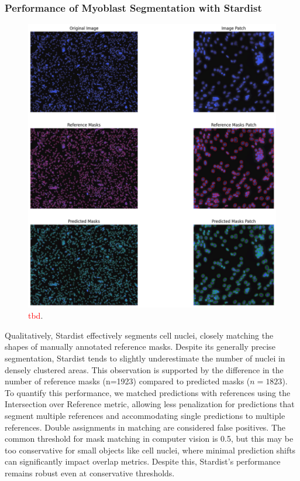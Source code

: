 \subsubsection{Performance of Myoblast Segmentation with Stardist}

\begin{figure}
	\centering
	\includegraphics[width=\textwidth]{"images/qualitative_performance_stardist.png"}
	\caption[Qualitative performance \texttt{Stardist}]{\textcolor{red}{tbd}.}
	\label{figperfstardistqual}
\end{figure} 

Qualitatively, Stardist effectively segments cell nuclei, closely matching the shapes of manually annotated reference masks. Despite its generally precise segmentation, Stardist tends to slightly underestimate the number of nuclei in densely clustered areas. This observation is supported by the difference in the number of reference masks (n=1923) compared to predicted masks ($n=1823$). To quantify this performance, we matched predictions with references using the Intersection over Reference metric, allowing less penalization for predictions that segment multiple references and accommodating single predictions to multiple references. Double assignments in matching are considered false positives.
The common threshold for mask matching in computer vision is 0.5, but this may be too conservative for small objects like cell nuclei, where minimal prediction shifts can significantly impact overlap metrics. Despite this, Stardist's performance remains robust even at conservative thresholds.


